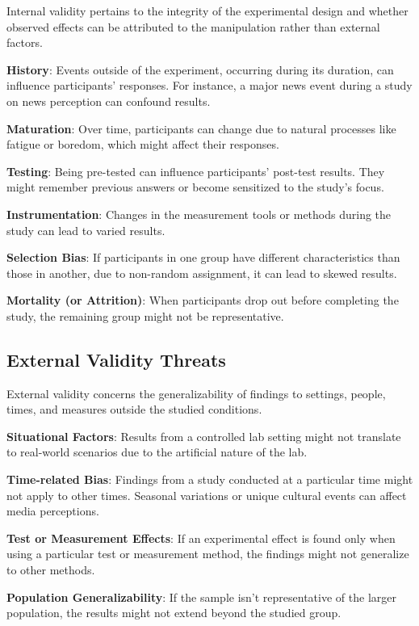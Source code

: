 \documentclass[
  b5paper]{book}
\begin{document}
Internal validity pertains to the integrity of the experimental design and whether observed effects can be attributed to the manipulation rather than external factors.

\textbf{History}: Events outside of the experiment, occurring during its duration, can influence participants' responses. For instance, a major news event during a study on news perception can confound results.

\textbf{Maturation}: Over time, participants can change due to natural processes like fatigue or boredom, which might affect their responses.

\textbf{Testing}: Being pre-tested can influence participants' post-test results. They might remember previous answers or become sensitized to the study's focus.

\textbf{Instrumentation}: Changes in the measurement tools or methods during the study can lead to varied results.

\textbf{Selection Bias}: If participants in one group have different characteristics than those in another, due to non-random assignment, it can lead to skewed results.

\textbf{Mortality (or Attrition)}: When participants drop out before completing the study, the remaining group might not be representative.

\hypertarget{external-validity-threats}{%
\subsection*{External Validity Threats}\label{external-validity-threats}}

External validity concerns the generalizability of findings to settings, people, times, and measures outside the studied conditions.

\textbf{Situational Factors}: Results from a controlled lab setting might not translate to real-world scenarios due to the artificial nature of the lab.

\textbf{Time-related Bias}: Findings from a study conducted at a particular time might not apply to other times. Seasonal variations or unique cultural events can affect media perceptions.

\textbf{Test or Measurement Effects}: If an experimental effect is found only when using a particular test or measurement method, the findings might not generalize to other methods.

\textbf{Population Generalizability}: If the sample isn't representative of the larger population, the results might not extend beyond the studied group.
\end{document}
